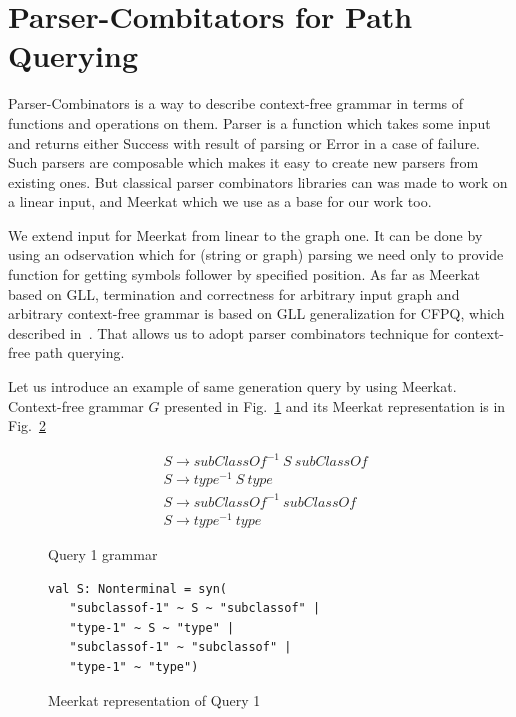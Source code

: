\section{Parser-Combitators for Path Querying}

Parser-Combinators is a way to describe context-free grammar in terms of functions and operations on them. 
Parser is a function which takes some input and returns either Success with result of parsing or Error in a case of failure. 
Such parsers are composable which makes it easy to create new parsers from existing ones.
But classical parser combinators libraries can was made to work on a linear input, and Meerkat which we use as a base for our work too.

We extend input for Meerkat from linear to the graph one.
It can be done by using an odservation which for (string or graph) parsing we need only to provide function for getting symbols follower by specified position.
As far as Meerkat based on GLL, termination and correctness for arbitrary input graph and arbitrary context-free grammar is based on GLL generalization for CFPQ, which described in~\cite{GrigorevR16}.
That allows us to adopt parser combinators technique for context-free path querying.

Let us introduce an example of same generation query by using Meerkat.
Context-free grammar $G$ presented in Fig.~\ref{fig:query1} and its Meerkat representation is in Fig.~\ref{fig:query1Meerkat}

\begin{figure}[h]
\begin{align*}
& S \rightarrow subClassOf^{-1}\ S\ subClassOf\\
& S \rightarrow type^{-1}\ S\ type\\
& S \rightarrow subClassOf^{-1}\ subClassOf\\
& S \rightarrow type^{-1}\ type
\end{align*}
\caption{Query 1 grammar}
\label{fig:query1}
\end{figure}

\begin{figure}[h]
\begin{lstlisting}
val S: Nonterminal = syn(
   "subclassof-1" ~ S ~ "subclassof" |
   "type-1" ~ S ~ "type" |
   "subclassof-1" ~ "subclassof" |
   "type-1" ~ "type")
\end{lstlisting}
\caption{Meerkat representation of Query 1}
\label{fig:query1Meerkat}
\end{figure}

